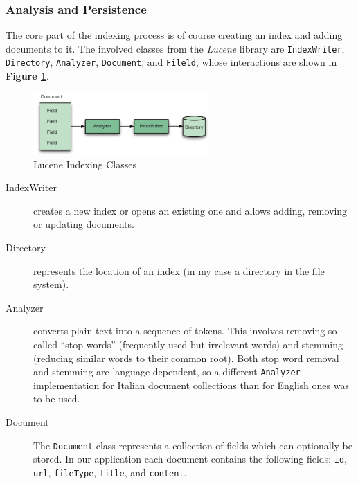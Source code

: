 \documentclass[a4paper]{usiinfbachelorproject}
\begin{document}
\subsubsection{Analysis and Persistence}

The core part of the indexing process is of course creating an index and adding documents to it. The involved classes from the \emph{Lucene} 
library are \texttt{IndexWriter}, \texttt{Directory}, \texttt{Analyzer}, \texttt{Document}, and \texttt{Fileld}, whose 
interactions are shown in \textbf{Figure \ref{fig:luceneIndexClasses}}.

\begin{figure}[h!]
\centering
\includegraphics[width=0.6\textwidth]{figures/luceneIndexClasses}
\caption{Lucene Indexing Classes \cite{luceneInAction}}
\label{fig:luceneIndexClasses}
\end{figure}

\begin{description}

    \item[IndexWriter] creates a new index or opens an existing one and allows adding, removing or updating documents.

    \item[Directory] represents the location of an index (in my case a directory in the file system).

    \item[Analyzer] converts plain text into a sequence of tokens. This involves removing so called ``stop words'' 
        (frequently used but irrelevant words) and stemming (reducing similar words to their common root). 
        Both stop word removal and stemming are language dependent, so a different \texttt{Analyzer} implementation
        for Italian document collections than for English ones was to be used.

    \item[Document] The \texttt{Document} class represents a collection of fields which can optionally be stored. 
        In our application each document contains the following fields; \texttt{id}, \texttt{url}, 
        \texttt{fileType}, \texttt{title}, and \texttt{content}.

\end{description}
\end{document}
